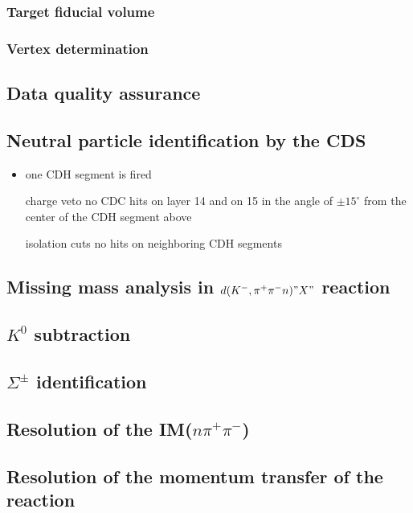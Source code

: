 \subsubsection{Target fiducial volume}

\subsubsection{Vertex determination}


\subsection{Data quality assurance}


\subsection{Neutral particle identification by the CDS}
\begin{itemize}
\item one CDH segment is fired
\item [charge veto] no CDC hits on layer 14 and on 15 in the angle of $\pm 15^\circ$ from the center of the CDH segment above
\item [isolation cuts] no hits on neighboring CDH segments
\end{itemize}

\subsection{Missing mass analysis in $d(K^-,\pi^+\pi^-n)"X"$ reaction}

\subsection{$K^0$ subtraction}


\subsection{$\Sigma^{\pm}$ identification}

\subsection{Resolution of the IM($n\pi^{+}\pi^{-}$)}

\subsection{Resolution of the momentum transfer of the reaction}


